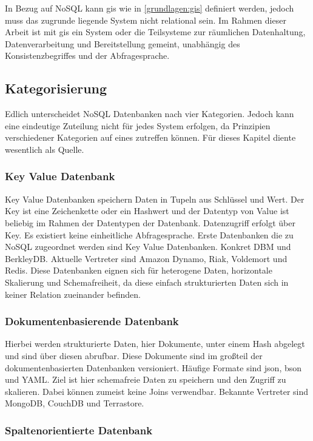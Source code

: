 In Bezug auf NoSQL kann \Gls{gis} wie in \ref{grundlagen:gis} definiert werden, jedoch muss das zugrunde liegende System nicht relational sein.
Im Rahmen dieser Arbeit ist mit \Gls{gis} ein System oder die Teilsysteme zur räumlichen Datenhaltung, Datenverarbeitung und Bereitstellung gemeint, unabhängig des Konsistenzbegriffes und der Abfragesprache.

\subsection{Kategorisierung}
Edlich unterscheidet NoSQL Datenbanken nach vier Kategorien.
Jedoch kann eine eindeutige Zuteilung nicht für jedes System erfolgen, da Prinzipien verschiedener Kategorien auf eines zutreffen können.
Für dieses Kapitel diente wesentlich \cite{book:nosql-einfuehrung} als Quelle.


\subsubsection{Key Value Datenbank}

Key Value Datenbanken speichern Daten in Tupeln aus Schlüssel und Wert.
Der Key ist eine Zeichenkette oder ein Hashwert und der Datentyp von Value ist beliebig im Rahmen der Datentypen der Datenbank.
Datenzugriff erfolgt über Key.
Es existiert keine einheitliche Abfragesprache.
Erste Datenbanken die zu NoSQL zugeordnet werden sind Key Value Datenbanken. Konkret DBM und BerkleyDB.
Aktuelle Vertreter sind Amazon Dynamo, Riak, Voldemort und Redis.
Diese Datenbanken eignen sich für heterogene Daten, horizontale Skalierung und Schemafreiheit, da diese einfach strukturierten Daten sich in keiner Relation zueinander befinden.

\subsubsection{Dokumentenbasierende Datenbank}

Hierbei werden strukturierte Daten, hier Dokumente, unter einem Hash abgelegt und sind über diesen abrufbar.
Diese Dokumente sind im großteil der dokumentenbasierten Datenbanken versioniert.
Häufige Formate sind \Gls{json}, \Gls{bson} und YAML.
Ziel ist hier schemafreie Daten zu speichern und den Zugriff zu skalieren.
Dabei können zumeist keine Joins verwendbar.
Bekannte Vertreter sind MongoDB, CouchDB und Terrastore.

\subsubsection{Spaltenorientierte Datenbank}

